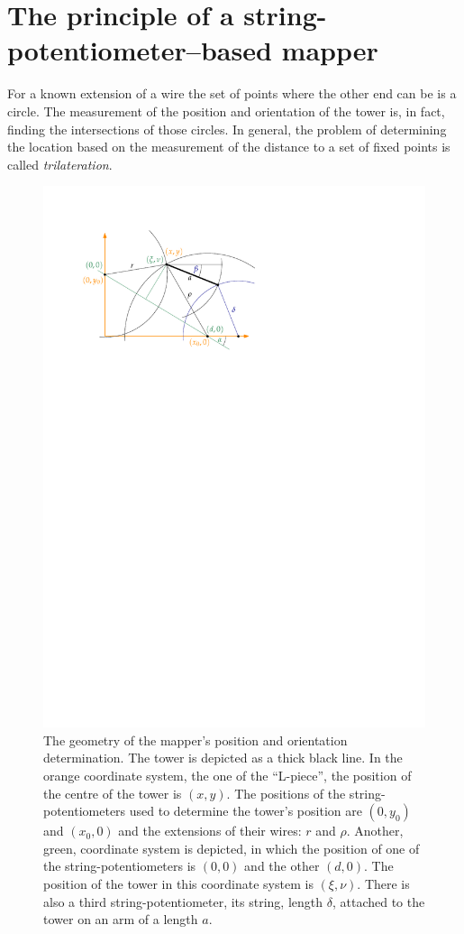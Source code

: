 \section{The principle of a string-potentiometer--based mapper}
For a known extension of a wire the set of points where the other end can be is a circle. The measurement of the position and orientation of the tower is, in fact, finding the intersections of those circles.
In general, the problem of determining the location based on the measurement of the distance to a set of fixed points is called \emph{trilateration}.

\begin{figure}
  \centering
  \includegraphics[width=0.7\linewidth]{gfx/mapping/geometry.pdf}
  \caption{The geometry of the mapper's position and orientation determination. The tower is depicted as a thick black line. In the orange coordinate system, the one of the ``L-piece'', the position of the centre of the tower is $(x,y)$. The positions of the string-potentiometers used to determine the tower's position are $(0, y_0)$ and $(x_0, 0)$ and the extensions of their wires: $r$ and $\rho$. Another, green, coordinate system is depicted, in which the position of one of the string-potentiometers is $(0,0)$ and the other $(d, 0)$. The position of the tower in this coordinate system is $(\xi, \nu)$. There is also a third string-potentiometer, its string, length $\delta$, attached to the tower on an arm of a length $a$.}\label{fig:mapping_geometry}
\end{figure}

